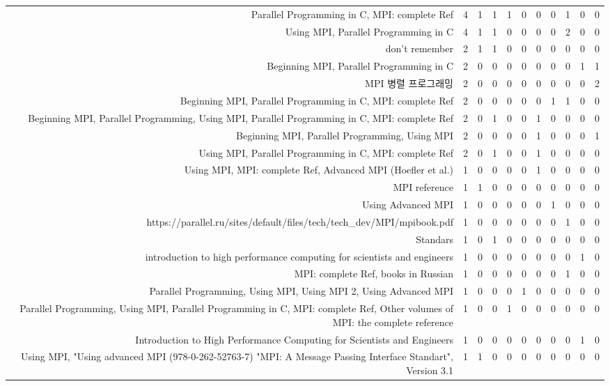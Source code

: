 {\begin{landscape}
\begin{longtable}[htb]{r|c|c|c|c|c|c|c|c|c|c}
{Parallel Programming in C, MPI: complete Ref} & 4 & 1 & 1 & 1 & 0 & 0 & 0 & 1 & 0 & 0 \\%
{Using MPI, Parallel Programming in C} & 4 & 1 & 1 & 0 & 0 & 0 & 0 & 2 & 0 & 0 \\%
{don't remember} & 2 & 1 & 1 & 0 & 0 & 0 & 0 & 0 & 0 & 0 \\%
{Beginning MPI, Parallel Programming in C} & 2 & 0 & 0 & 0 & 0 & 0 & 0 & 0 & 1 & 1 \\%
{MPI 병렬 프로그래밍} & 2 & 0 & 0 & 0 & 0 & 0 & 0 & 0 & 0 & 2 \\%
{Beginning MPI, Parallel Programming in C, MPI: complete Ref} & 2 & 0 & 0 & 0 & 0 & 0 & 1 & 1 & 0 & 0 \\%
{Beginning MPI, Parallel Programming, Using MPI, Parallel Programming in C, MPI: complete Ref} & 2 & 0 & 1 & 0 & 0 & 1 & 0 & 0 & 0 & 0 \\%
{Beginning MPI, Parallel Programming, Using MPI} & 2 & 0 & 0 & 0 & 0 & 1 & 0 & 0 & 0 & 1 \\%
{Using MPI, Parallel Programming in C, MPI: complete Ref} & 2 & 0 & 1 & 0 & 0 & 1 & 0 & 0 & 0 & 0 \\%
{Using MPI, MPI: complete Ref, Advanced MPI (Hoefler et al.)} & 1 & 0 & 0 & 0 & 0 & 1 & 0 & 0 & 0 & 0 \\%
{MPI reference} & 1 & 1 & 0 & 0 & 0 & 0 & 0 & 0 & 0 & 0 \\%
{Using Advanced MPI} & 1 & 0 & 0 & 0 & 0 & 0 & 1 & 0 & 0 & 0 \\%
{https://parallel.ru/sites/default/files/tech/tech\_dev/MPI/mpibook.pdf} & 1 & 0 & 0 & 0 & 0 & 0 & 0 & 1 & 0 & 0 \\%
{Standars} & 1 & 0 & 1 & 0 & 0 & 0 & 0 & 0 & 0 & 0 \\%
{introduction to high performance computing for scientists and engineers} & 1 & 0 & 0 & 0 & 0 & 0 & 0 & 0 & 1 & 0 \\%
{MPI: complete Ref, books in Russian} & 1 & 0 & 0 & 0 & 0 & 0 & 0 & 1 & 0 & 0 \\%
{Parallel Programming, Using MPI, Using MPI 2, Using Advanced MPI} & 1 & 0 & 0 & 0 & 1 & 0 & 0 & 0 & 0 & 0 \\%
{Parallel Programming, Using MPI, Parallel Programming in C, MPI: complete Ref, Other volumes of MPI: the complete reference} & 1 & 0 & 0 & 1 & 0 & 0 & 0 & 0 & 0 & 0 \\%
{Introduction to High Performance Computing for Scientists and Engineers} & 1 & 0 & 0 & 0 & 0 & 0 & 0 & 0 & 1 & 0 \\%
{Using MPI, "Using advanced MPI (978-0-262-52763-7)  "MPI: A Message Passing Interface Standart", Version 3.1} & 1 & 1 & 0 & 0 & 0 & 0 & 0 & 0 & 0 & 0 \\%

\end{longtable}
\end{landscape}}
